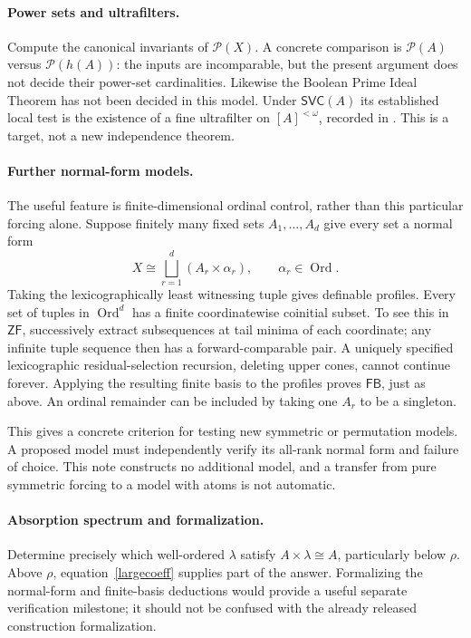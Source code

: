 \documentclass[11pt,a4paper]{article}
\newcommand{\ZF}{\mathsf{ZF}}
\newcommand{\FB}{\mathsf{FB}}
\newcommand{\SVC}{\mathsf{SVC}}
\newcommand{\Ord}{\operatorname{Ord}}
\newcommand{\calP}{\mathcal P}
\theoremstyle{definition}
\theoremstyle{remark}
\begin{document}
\paragraph{Power sets and ultrafilters.}
Compute the canonical invariants of $\calP(X)$. A concrete comparison is $\calP(A)$ versus $\calP(h(A))$: the inputs are incomparable, but the present argument does not decide their power-set cardinalities. Likewise the Boolean Prime Ideal Theorem has not been decided in this model. Under $\SVC(A)$ its established local test is the existence of a fine ultrafilter on $[A]^{<\omega}$, recorded in \cite[Section 3.6]{RyanSmith}. This is a target, not a new independence theorem.

\paragraph{Further normal-form models.}
The useful feature is finite-dimensional ordinal control, rather than this particular forcing alone. Suppose finitely many fixed sets $A_1,\ldots,A_d$ give every set a normal form
\[
 X\cong\bigsqcup_{r=1}^{d}(A_r\times\alpha_r),\qquad \alpha_r\in\Ord.
\]
Taking the lexicographically least witnessing tuple gives definable profiles. Every set of tuples in $\Ord^d$ has a finite coordinatewise coinitial subset. To see this in $\ZF$, successively extract subsequences at tail minima of each coordinate; any infinite tuple sequence then has a forward-comparable pair. A uniquely specified lexicographic residual-selection recursion, deleting upper cones, cannot continue forever. Applying the resulting finite basis to the profiles proves $\FB$, just as above. An ordinal remainder can be included by taking one $A_r$ to be a singleton.

This gives a concrete criterion for testing new symmetric or permutation models. A proposed model must independently verify its all-rank normal form and failure of choice. This note constructs no additional model, and a transfer from pure symmetric forcing to a model with atoms is not automatic.

\paragraph{Absorption spectrum and formalization.}
Determine precisely which well-ordered $\lambda$ satisfy $A\times\lambda\cong A$, particularly below $\rho$. Above $\rho$, equation~\eqref{largecoeff} supplies part of the answer. Formalizing the normal-form and finite-basis deductions would provide a useful separate verification milestone; it should not be confused with the already released construction formalization.
\end{document}
